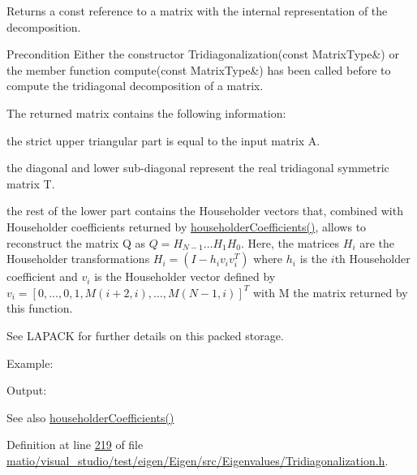 \begin{DoxyReturn}{Returns}
a const reference to a matrix with the internal representation of the decomposition.
\end{DoxyReturn}
\begin{DoxyPrecond}{Precondition}
Either the constructor Tridiagonalization(const Matrix\+Type\&) or the member function compute(const Matrix\+Type\&) has been called before to compute the tridiagonal decomposition of a matrix.
\end{DoxyPrecond}
The returned matrix contains the following information\+:
\begin{DoxyItemize}
\item the strict upper triangular part is equal to the input matrix A.
\item the diagonal and lower sub-\/diagonal represent the real tridiagonal symmetric matrix T.
\item the rest of the lower part contains the Householder vectors that, combined with Householder coefficients returned by \hyperlink{group___eigenvalues___module_ac95b4e43dcf6c3c5074b8bea4fc67887}{householder\+Coefficients()}, allows to reconstruct the matrix Q as $ Q = H_{N-1} \ldots H_1 H_0 $. Here, the matrices $ H_i $ are the Householder transformations $ H_i = (I - h_i v_i v_i^T) $ where $ h_i $ is the $ i $th Householder coefficient and $ v_i $ is the Householder vector defined by $ v_i = [ 0, \ldots, 0, 1, M(i+2,i), \ldots, M(N-1,i) ]^T $ with M the matrix returned by this function.
\end{DoxyItemize}

See L\+A\+P\+A\+CK for further details on this packed storage.

Example\+: 
\begin{DoxyCodeInclude}
\end{DoxyCodeInclude}
 Output\+: 
\begin{DoxyVerbInclude}
\end{DoxyVerbInclude}


\begin{DoxySeeAlso}{See also}
\hyperlink{group___eigenvalues___module_ac95b4e43dcf6c3c5074b8bea4fc67887}{householder\+Coefficients()} 
\end{DoxySeeAlso}


Definition at line \hyperlink{matio_2visual__studio_2test_2eigen_2_eigen_2src_2_eigenvalues_2_tridiagonalization_8h_source_l00219}{219} of file \hyperlink{matio_2visual__studio_2test_2eigen_2_eigen_2src_2_eigenvalues_2_tridiagonalization_8h_source}{matio/visual\+\_\+studio/test/eigen/\+Eigen/src/\+Eigenvalues/\+Tridiagonalization.\+h}.

